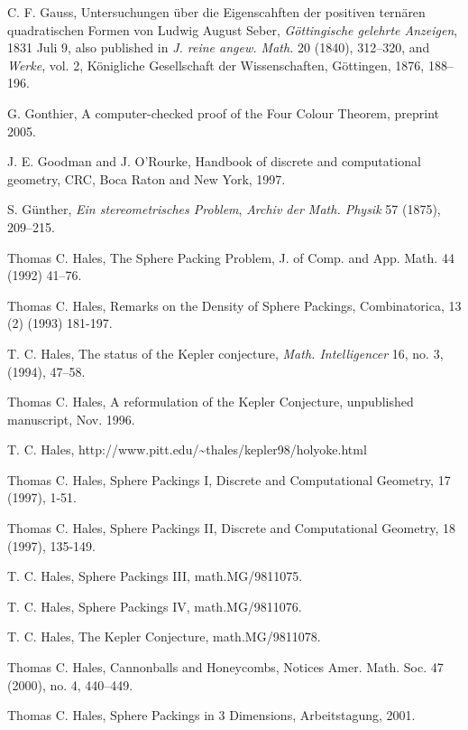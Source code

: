 \begin{thebibliography}{CHMS94}
 C. F. Gauss, Untersuchungen \"uber die Eigenscahften der
positiven tern\"aren quadratischen Formen von Ludwig August Seber,
    {\it G\"ottingische gelehrte Anzeigen}, 1831 Juli 9,
also published in {\it J. reine angew. Math.} 20 (1840), 312--320,
and
    {\it Werke},  vol. 2,
    K\"onigliche Gesellschaft der Wissenschaften, G\"ottingen,
            1876, 188--196.

 G. Gonthier, A computer-checked proof of the Four
Colour Theorem, preprint 2005.

 J. E. Goodman and J. O'Rourke, Handbook of discrete and
    computational geometry, CRC, Boca Raton and New York, 1997.

 S. G\"unther, {\it Ein stereometrisches Problem},
{\it Archiv der Math. Physik} 57 (1875), 209--215.

 Thomas C. Hales, The Sphere Packing Problem, J. of Comp.
and App. Math. 44 (1992) 41--76.

 Thomas C. Hales, Remarks on the Density of Sphere Packings,
        Combinatorica, 13 (2) (1993) 181-197.

 T. C. Hales, The status of the Kepler conjecture,
    {\it Math. Intelligencer} 16, no. 3, (1994), 47--58.

 Thomas C. Hales, A reformulation of the
Kepler Conjecture, unpublished manuscript, Nov. 1996.

 T. C. Hales,
    {http://www.pitt.edu/\~\relax thales/kepler98/holyoke.html}

 Thomas C. Hales, Sphere Packings I,
    Discrete and Computational Geometry, 17 (1997), 1-51.

 Thomas C. Hales, Sphere Packings II,
    Discrete and Computational Geometry, 18 (1997), 135-149.

 T. C. Hales, Sphere Packings III, math.MG/9811075.

 T. C. Hales, Sphere Packings IV, math.MG/9811076.

 T. C. Hales, The Kepler Conjecture, math.MG/9811078.

 Thomas C. Hales, Cannonballs and Honeycombs,
Notices Amer. Math. Soc.  47  (2000),  no. 4, 440--449.

 Thomas C. Hales, Sphere Packings in 3
Dimensions, Arbeitstagung, 2001.


\end{thebibliography}
